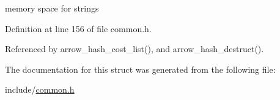 memory space for strings 

Definition at line 156 of file common.h.

Referenced by arrow\_\-hash\_\-cost\_\-list(), and arrow\_\-hash\_\-destruct().

The documentation for this struct was generated from the following file:\begin{CompactItemize}
\item 
include/\hyperlink{common_8h}{common.h}\end{CompactItemize}
